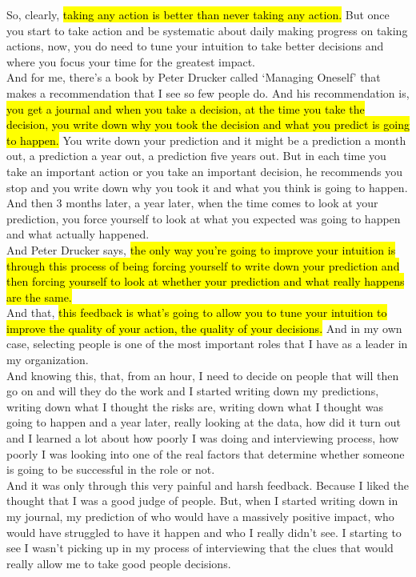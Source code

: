 \documentclass[a4paper,12pt]{article}
\begin{document}
So, clearly, \hl{taking any action is better than never taking any action.} But once you start to take action and be systematic about daily making progress on taking actions, now, you do need to tune your intuition to take better decisions and where you focus your time for the greatest impact. \\

And for me, there's a book by Peter Drucker called `Managing Oneself' that makes a recommendation that I see so few people do. And his recommendation is, \hl{you get a journal and when you take a decision, at the time you take the decision, you write down why you took the decision and what you predict is going to happen.} You write down your prediction and it might be a prediction a month out, a prediction a year out, a prediction five years out. But in each time you take an important action or you take an important decision, he recommends you stop and you write down why you took it and what you think is going to happen. And then 3 months later, a year later, when the time comes to look at your prediction, you force yourself to look at what you expected was going to happen and what actually happened. \\

And Peter Drucker says, \hl{the only way you're going to improve your intuition is through this process of being forcing yourself to write down your prediction and then forcing yourself to look at whether your prediction and what really happens are the same.} \\

And that, \hl{this feedback is what's going to allow you to tune your intuition to improve the quality of your action, the quality of your decisions.} And in my own case, selecting people is one of the most important roles that I have as a leader in my organization. \\

And knowing this, that, from an hour, I need to decide on people that will then go on and will they do the work and I started writing down my predictions, writing down what I thought the risks are, writing down what I thought was going to happen and a year later, really looking at the data, how did it turn out and I learned a lot about how poorly I was doing and interviewing process, how poorly I was looking into one of the real factors that determine whether someone is going to be successful in the role or not. \\

And it was only through this very painful and harsh feedback. Because I liked the thought that I was a good judge of people. But, when I started writing down in my journal, my prediction of who would have a massively positive impact, who would have struggled to have it happen and who I really didn't see. I starting to see I wasn't picking up in my process of interviewing that the clues that would really allow me to take good people decisions. \\
\end{document}
